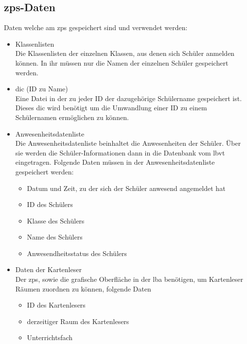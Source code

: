 \subsection{\gls{zps}-Daten}
Daten welche am \gls{zps} gespeichert sind und verwendet werden:
\begin{itemize}[leftmargin=1.0in]
    \item [\ld] Klassenlisten \\
    Die Klassenlisten der einzelnen Klassen, aus denen sich Schüler anmelden können. In ihr müssen nur die Namen der einzelnen Schüler gespeichert werden. \newpage
    
    
    \item [\ld] \gls{dic} (ID zu Name) \\
    Eine Datei in der zu jeder ID der dazugehörige Schülername gespeichert ist. Dieses \gls{dic} wird benötigt um die Umwandlung einer ID zu einem Schülernamen ermöglichen zu können.
    \item [\ld] Anwesenheitsdatenliste \\
    Die Anwesenheitsdatenliste beinhaltet die Anwesenheiten der Schüler. Über sie werden die Schüler-Informationen dann in die Datenbank vom \gls{lbvt} eingetragen. Folgende Daten müssen in der Anwesenheitsdatenliste gespeichert werden:
    \begin{itemize}
        \item Datum und Zeit, zu der sich der Schüler anwesend angemeldet hat 
        \item ID des Schülers
        \item Klasse des Schülers
        \item Name des Schülers
        \item Anwesendheitsstatus des Schülers
    \end{itemize}
    \item [\ld] Daten der Kartenleser \\
    Der \gls{zps}, sowie die grafische Oberfläche in der \gls{lba} benötigen, um Kartenleser Räumen zuordnen zu können, folgende Daten
    \begin{itemize}
        \item ID des Kartenlesers
        \item derzeitiger Raum des Kartenlesers
        \item Unterrichtsfach
    \end{itemize}
\end{itemize}


